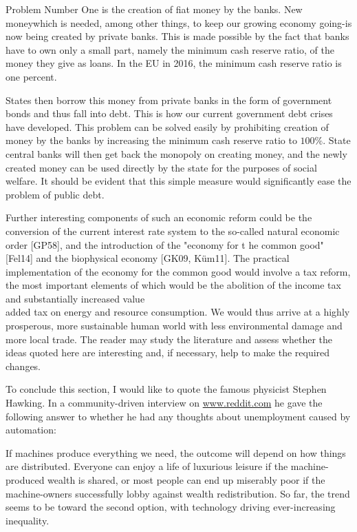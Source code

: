 \documentclass[10pt]{article}
\begin{document}
Problem Number One is the creation of fiat money by the banks. New moneywhich is needed, among other things, to keep our growing economy going-is now being created by private banks. This is made possible by the fact that banks have to own only a small part, namely the minimum cash reserve ratio, of the money they give as loans. In the EU in 2016, the minimum cash reserve ratio is one percent.

States then borrow this money from private banks in the form of government bonds and thus fall into debt. This is how our current government debt crises have developed. This problem can be solved easily by prohibiting creation of money by the banks by increasing the minimum cash reserve ratio to $100 \%$. State central banks will then get back the monopoly on creating money, and the newly created money can be used directly by the state for the purposes of social welfare. It should be evident that this simple measure would significantly ease the problem of public debt.

Further interesting components of such an economic reform could be the conversion of the current interest rate system to the so-called natural economic order [GP58], and the introduction of the "economy for t
he common good" [Fel14] and the biophysical economy [GK09, Küm11]. The practical implementation of the economy for the common good would involve a tax reform, the most important elements of which would be the abolition of the income tax and substantially increased value\\
added tax on energy and resource consumption. We would thus arrive at a highly prosperous, more sustainable human world with less environmental damage and more local trade. The reader may study the literature and assess whether the ideas quoted here are interesting and, if necessary, help to make the required changes.

To conclude this section, I would like to quote the famous physicist Stephen Hawking. In a community-driven interview on \href{http://www.reddit.com}{www.reddit.com} he gave the following answer to whether he had any thoughts about unemployment caused by automation:

\begin{displayquote}
If machines produce everything we need, the outcome will depend on how things are distributed. Everyone can enjoy a life of luxurious leisure if the machine-produced wealth is shared, or most people can end up miserably poor if the machine-owners successfully lobby against wealth redistribution. So far, the trend seems to be toward the second option, with technology driving ever-increasing inequality.
\end{displayquote}
\end{document}
